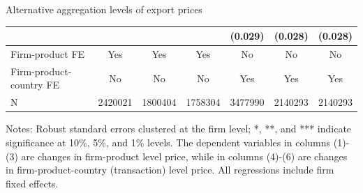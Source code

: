 \documentclass[10pt]{beamer}
\begin{document}
\begin{frame}[label=appendix_tab.altagg]{Alternative aggregation levels of export prices}
\begin{table}[htbp]
{\begin{threeparttable}
\begin{tabular}{lcccccc}
              &       &       &       & (0.029) & (0.028) & (0.028) \\
        \midrule
        Firm-product FE & Yes   & Yes   & Yes   & No    & No    & No \\
        Firm-product-country FE & No    & No    & No    & Yes   & Yes   & Yes \\
        N     & 2420021 & 1800404 & 1758304 & 3477990 & 2140293 & 2140293 \\
        \bottomrule
    \end{tabular}
        \begin{tablenotes}
            \footnotesize
            \item Notes: Robust standard errors clustered at the firm level;  *, **, and *** indicate significance at 10\%, 5\%, and 1\% levels. The dependent variables in columns (1)-(3) are changes in firm-product level price, while in columns (4)-(6) are changes in firm-product-country (transaction) level price. All regressions include firm fixed effects.
	\end{tablenotes}
    \end{threeparttable}
    }
    \label{tab.altagg}
\end{table}
\hyperlink{robustness_other}{}
\hyperlink{alt_erpt}{}
\end{frame}
\end{document}
